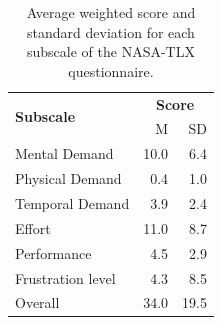 \begin{table}[ht]
    \footnotesize
    \centering
    \begin{tabular}{lrr}
        \toprule
        \multirow{2}{*}{\textbf{Subscale}} & \multicolumn{2}{c}{\textbf{Score}} \\
         & M & SD \\
        \midrule
        Mental Demand & 10.0 & 6.4 \\
        Physical Demand & 0.4 & 1.0 \\
        Temporal Demand & 3.9 & 2.4 \\
        Effort & 11.0 & 8.7 \\
        Performance & 4.5 & 2.9 \\
        Frustration level & 4.3 & 8.5 \\
        \midrule
        Overall & 34.0 & 19.5 \\
        \bottomrule
    \end{tabular}
    \caption{Average weighted score and standard deviation for each subscale of the NASA-TLX questionnaire.}
    \label{tbl:quantumleap:nasa-tlx}
\end{table}

